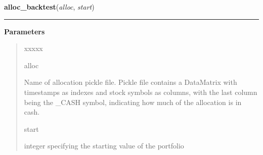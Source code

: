 \hspace{.8\funcindent}\begin{boxedminipage}{\funcwidth}

    \raggedright \textbf{alloc\_backtest}(\textit{alloc}, \textit{start})

    \vspace{-1.5ex}

    \rule{\textwidth}{0.5\fboxrule}
\setlength{\parskip}{2ex}
\setlength{\parskip}{1ex}
      \textbf{Parameters}
      \vspace{-1ex}

      \begin{quote}
        \begin{Ventry}{xxxxx}

          \item[alloc]

          Name of allocation pickle file. Pickle file contains a DataMatrix
          with timestamps as indexes and stock symbols as columns, with the
          last column being the \_CASH symbol, indicating how much of the 
          allocation is in cash.

          \item[start]

          integer specifying the starting value of the portfolio

        \end{Ventry}

      \end{quote}

    \end{boxedminipage}

    \label{QSTK:quicksim:quickSim:strat_backtest1}

    \vspace{0.5ex}

